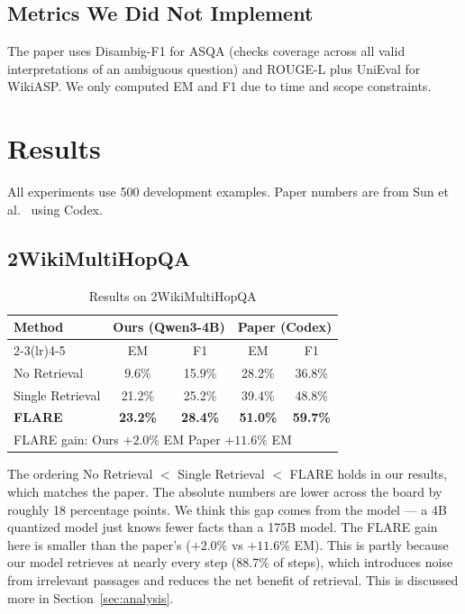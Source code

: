 \documentclass[conference]{IEEEtran}
\begin{document}
\subsection{Metrics We Did Not Implement}
The paper uses Disambig-F1 for ASQA (checks coverage across all
valid interpretations of an ambiguous question) and ROUGE-L plus
UniEval for WikiASP. We only computed EM and F1 due to time and
scope constraints.

\section{Results}
\label{sec:results}

All experiments use 500 development examples. Paper numbers are from
Sun et al.~\cite{sun2023flare} using Codex.

\subsection{2WikiMultiHopQA}

\begin{table}[htbp]
\caption{Results on 2WikiMultiHopQA}
\label{tab:2wiki}
\centering
\begin{tabular}{lcccc}
\toprule
\multirow{2}{*}{\textbf{Method}} &
  \multicolumn{2}{c}{\textbf{Ours (Qwen3-4B)}} &
  \multicolumn{2}{c}{\textbf{Paper (Codex)}} \\
\cmidrule(lr){2-3}\cmidrule(lr){4-5}
& EM & F1 & EM & F1 \\
\midrule
No Retrieval     & 9.6\%  & 15.9\% & 28.2\% & 36.8\% \\
Single Retrieval & 21.2\% & 25.2\% & 39.4\% & 48.8\% \\
\textbf{FLARE}   & \textbf{23.2\%} & \textbf{28.4\%}
                 & \textbf{51.0\%} & \textbf{59.7\%} \\
\midrule
\multicolumn{5}{l}{\small FLARE gain: Ours $+2.0\%$ EM \quad Paper $+11.6\%$ EM} \\
\bottomrule
\end{tabular}
\end{table}

The ordering No Retrieval $<$ Single Retrieval $<$ FLARE holds in
our results, which matches the paper. The absolute numbers are lower
across the board by roughly 18 percentage points. We think this gap
comes from the model — a 4B quantized model just knows fewer facts
than a 175B model. The FLARE gain here is smaller than the paper's
($+2.0\%$ vs $+11.6\%$ EM). This is partly because our model
retrieves at nearly every step (88.7\% of steps), which introduces
noise from irrelevant passages and reduces the net benefit of
retrieval. This is discussed more in Section~\ref{sec:analysis}.
\end{document}
